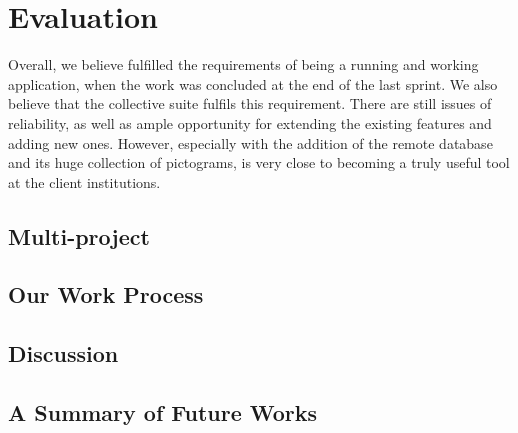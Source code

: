 \chapter{Evaluation}\label{chap:evaluation}

Overall, we believe \launcher fulfilled the requirements of being a running and working application, when the work was concluded at the end of the last sprint.
We also believe that the collective \giraf suite fulfils this requirement.
There are still issues of reliability, as well as ample opportunity for extending the existing features and adding new ones.
However, especially with the addition of the remote database and its huge collection of pictograms, \giraf is very close to becoming a truly useful tool at the client institutions. 

\section{Multi-project}\label{sec:eval:multiproject}


\section{Our Work Process}\label{sec:eval:us}


\section{Discussion}\label{sec:eval:discussion}


\section{A Summary of Future Works}
